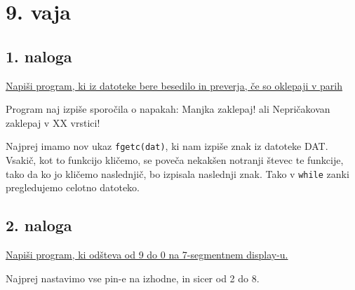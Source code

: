 \documentclass[a4paper, 12pt]{article}
\begin{document}
\section*{9. vaja}
\subsection*{1. naloga}

\underline{Napiši program, ki iz datoteke bere besedilo in preverja, če so oklepaji v parih}\

Program naj izpiše sporočila o napakah: Manjka zaklepaj! ali Nepričakovan zaklepaj v XX vrstici!\

Najprej imamo nov ukaz \lstinline|fgetc(dat)|, ki nam izpiše znak iz datoteke DAT. Vsakič, kot to funkcijo kličemo, se poveča nekakšen notranji števec te funkcije, tako da ko jo kličemo naslednjič, bo izpisala naslednji znak. Tako v \lstinline|while| zanki pregledujemo celotno datoteko.


\subsection*{2. naloga}

\underline{Napiši program, ki odšteva od 9 do 0 na 7-segmentnem display-u.}

Najprej nastavimo vse pin-e na izhodne, in sicer od 2 do 8. 
\end{document}
